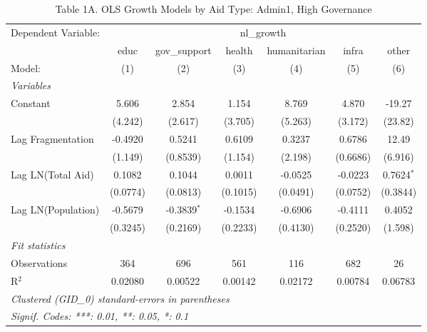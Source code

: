 \begin{table}[H]
   \caption{Table 1A. OLS Growth Models by Aid Type: Admin1, High Governance}
   \centering
   \begin{tabular}{lcccccc}
      \tabularnewline \midrule \midrule
      Dependent Variable: & \multicolumn{6}{c}{nl\_growth}\\
                         & educ     & gov\_support  & health   & humanitarian & infra    & other \\   
      Model:             & (1)      & (2)           & (3)      & (4)          & (5)      & (6)\\  
      \midrule
      \emph{Variables}\\
      Constant           & 5.606    & 2.854         & 1.154    & 8.769        & 4.870    & -19.27\\   
                         & (4.242)  & (2.617)       & (3.705)  & (5.263)      & (3.172)  & (23.82)\\   
      Lag Fragmentation  & -0.4920  & 0.5241        & 0.6109   & 0.3237       & 0.6786   & 12.49\\   
                         & (1.149)  & (0.8539)      & (1.154)  & (2.198)      & (0.6686) & (6.916)\\   
      Lag LN(Total Aid)  & 0.1082   & 0.1044        & 0.0011   & -0.0525      & -0.0223  & 0.7624$^{*}$\\   
                         & (0.0774) & (0.0813)      & (0.1015) & (0.0491)     & (0.0752) & (0.3844)\\   
      Lag LN(Population) & -0.5679  & -0.3839$^{*}$ & -0.1534  & -0.6906      & -0.4111  & 0.4052\\   
                         & (0.3245) & (0.2169)      & (0.2233) & (0.4130)     & (0.2520) & (1.598)\\   
      \midrule
      \emph{Fit statistics}\\
      Observations       & 364      & 696           & 561      & 116          & 682      & 26\\  
      R$^2$              & 0.02080  & 0.00522       & 0.00142  & 0.02172      & 0.00784  & 0.06783\\  
      \midrule \midrule
      \multicolumn{7}{l}{\emph{Clustered (GID\_0) standard-errors in parentheses}}\\
      \multicolumn{7}{l}{\emph{Signif. Codes: ***: 0.01, **: 0.05, *: 0.1}}\\
   \end{tabular}
\end{table}



